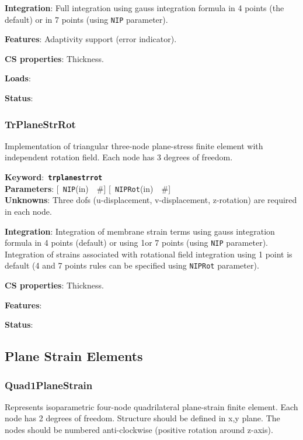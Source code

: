\documentclass[a4paper]{article}
\newcommand{\descitem}[1]{{\noindent \bf #1}:}
\newcommand{\elemkeyword}[1]{\descitem{Keyword}~{\bf \texttt{#1}}}
\newcommand{\elemparam}[2]{{{\texttt{#1}\tiny (#2)}~~\#}}
\newcommand{\optelemparam}[2]{{[~\elemparam{#1}{#2}]}}
\newcommand{\param}[1]{{\texttt{#1}}}
\begin{document}
\descitem{Integration}
Full integration using gauss integration formula in 4 points (the
default) or in 7 points (using \param{NIP} parameter).

\descitem{Features} Adaptivity support (error indicator).

\descitem{CS properties} Thickness. 

\descitem{Loads} 

\descitem{Status} 

\subsubsection{TrPlaneStrRot}
Implementation of triangular three-node  plane-stress 
finite element with independent rotation field.
Each node has 3 degrees of freedom.

\elemkeyword{trplanestrrot}\\
\descitem{Parameters} \optelemparam{NIP}{in} \optelemparam{NIPRot}{in}\\
\descitem{Unknowns}
Three dofs (u-displacement, v-displacement, z-rotation) are required in each node.


\descitem{Integration}
Integration of membrane strain terms using gauss integration formula
in 4 points (default) or using 1or 7 points (using \param{NIP} parameter).
Integration of strains associated with rotational field 
integration using 1 point is default (4 and 7 points rules can be
specified using \param{NIPRot} parameter).

\descitem{CS properties} Thickness. 

\descitem{Features} 

\descitem{Status} 

\subsection{Plane Strain Elements}

\subsubsection{Quad1PlaneStrain}
Represents isoparametric four-node quadrilateral plane-strain
finite element. Each node has 2 degrees of freedom.
Structure should be defined in x,y plane. 
The nodes should be numbered anti-clockwise (positive rotation around
z-axis). 
\end{document}
